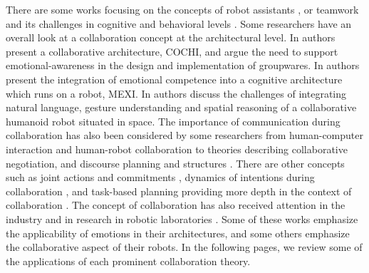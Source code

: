 There are some works focusing on the concepts of robot assistants
\cite{clancey:agent-assistants-collaboration}, or teamwork and its challenges in
cognitive and behavioral levels
\cite{nikolaidis:collaboration-joint-action,scerri:prototype-distributed-teams}.
Some researchers have an overall look at a collaboration concept at the
architectural level. In \cite{garcia:collaboration-emotional-awareness} authors
present a collaborative architecture, COCHI, and argue the need to support
emotional-awareness in the design and implementation of groupwares. In
\cite{esau:integrating-emotion-collaboration} authors present the integration of
emotional competence into a cognitive architecture which runs on a robot, MEXI.
In \cite{sofge:collaboration-humanoid-space} authors discuss the challenges of
integrating natural language, gesture understanding and spatial reasoning of a
collaborative humanoid robot situated in space. The importance of communication
during collaboration has also been considered by some researchers from
human-computer interaction and human-robot collaboration
\cite{clair:action-intention-collaboraiton,matignon:verbal-nonverbal-collaboration,rich:discourse}
to theories describing collaborative negotiation, and discourse planning and
structures
\cite{andriessen:disourse-planning,grosz:discourse-structure,sidner:discourse-collaborative-negotiation}.
There are other concepts such as joint actions and commitments
\cite{grosz:intention-dynamics-collaboration}, dynamics of intentions during
collaboration \cite{levesque:acting-together}, and task-based planning providing
more depth in the context of collaboration
\cite{burghart:cognitive-architecture-robot,rich:cea}. The concept of
collaboration has also received attention in the industry and in research in
robotic laboratories \cite{green:collaboration-literature-review}. Some of these
works emphasize the applicability of emotions in their architectures, and some
others emphasize the collaborative aspect of their robots. In the following
pages, we review some of the applications of each prominent collaboration
theory.\\

